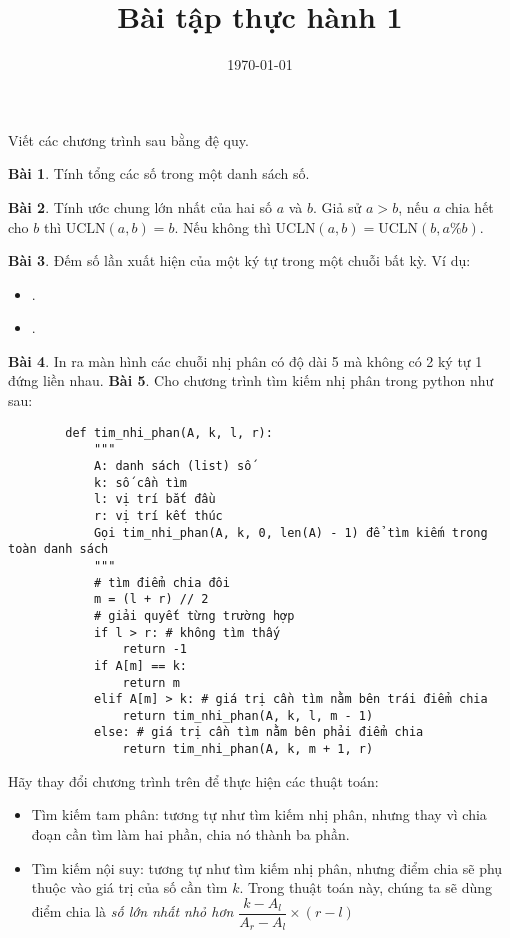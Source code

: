 \documentclass[12pt, a4paper]{article}
\title{Bài tập thực hành 1}
\date{\today}
\begin{document}
    \onehalfspacing
    \maketitle
    Viết các chương trình sau bằng đệ quy.

    \textbf{Bài 1}. Tính tổng các số trong một danh sách số.

    \textbf{Bài 2}. Tính ước chung lớn nhất của hai số $a$ và $b$. 
    Giả sử $a > b$, nếu $a$ chia hết cho $b$ thì $\text{UCLN}(a, b) = b$.
    Nếu không thì $\text{UCLN}(a, b) = \text{UCLN}(b, a \% b)$.
    
    \textbf{Bài 3}. Đếm số lần xuất hiện của một ký tự trong một chuỗi bất kỳ.
    Ví dụ:
    \begin{itemize}
        \item \texttt{}.
        \item \texttt{}.
    \end{itemize}

    \textbf{Bài 4}. In ra màn hình các chuỗi nhị phân có độ dài 5 mà không có 2 ký tự 1 đứng liền nhau.
    \newpage
    \textbf{Bài 5}. Cho chương trình tìm kiếm nhị phân trong python như sau:
    \begin{verbatim}
        def tim_nhi_phan(A, k, l, r):
            """
            A: danh sách (list) số
            k: số cần tìm
            l: vị trí bắt đầu
            r: vị trí kết thúc
            Gọi tim_nhi_phan(A, k, 0, len(A) - 1) để tìm kiếm trong toàn danh sách
            """
            # tìm điểm chia đôi
            m = (l + r) // 2
            # giải quyết từng trường hợp
            if l > r: # không tìm thấy
                return -1
            if A[m] == k:
                return m
            elif A[m] > k: # giá trị cần tìm nằm bên trái điểm chia
                return tim_nhi_phan(A, k, l, m - 1)
            else: # giá trị cần tìm nằm bên phải điểm chia
                return tim_nhi_phan(A, k, m + 1, r)
    \end{verbatim}
    Hãy thay đổi chương trình trên để thực hiện các thuật toán:
    \begin{itemize}
        \item Tìm kiếm tam phân: tương tự như tìm kiếm nhị phân, 
        nhưng thay vì chia đoạn cần tìm làm hai phần, chia nó thành ba phần.
        \item Tìm kiếm nội suy: tương tự như tìm kiếm nhị phân, 
        nhưng điểm chia sẽ phụ thuộc vào giá trị của số cần tìm $k$.
        Trong thuật toán này, chúng ta sẽ dùng điểm chia là \textit{số lớn nhất nhỏ hơn}
        $\dfrac{k - A_l}{A_r - A_l} \times (r - l)$
    \end{itemize}
\end{document}
